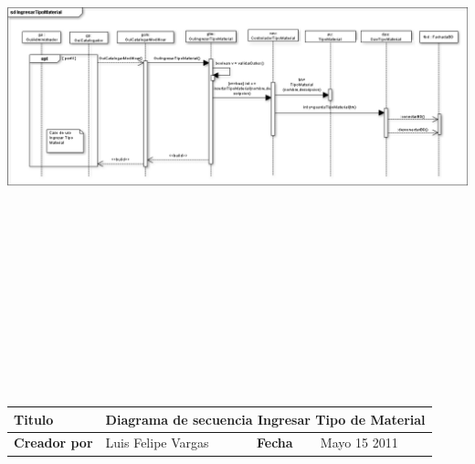 				\begin{minipage}[c]{1\linewidth}
				\centering
    			\includegraphics[width=21cm, height=17cm, angle=90]
    			{diagramasSecuencia/IngresarTipoMaterial}\\[0.5cm]
    			
    			\begin{tabular}{|p{0.225\textwidth}|p{}|p{}
    			|p{}|}
			    \hline
			    {\bf Titulo} & 
			    \multicolumn{3}{p{0.675\textwidth}|}{Diagrama de secuencia Ingresar Tipo de Material}\\
			    \hline
			    \hline
			    {\bf Creador por} & {Luis Felipe Vargas} & {\bf Fecha} & {Mayo 15 2011}\\
			    \hline
			    \end{tabular}
			    \end{minipage}
			    
			
